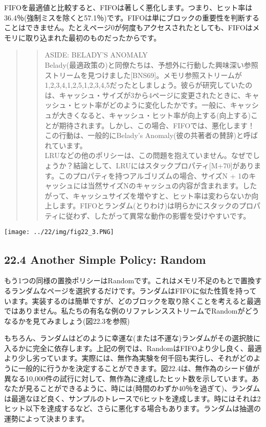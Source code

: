 FIFOを最適値と比較すると、FIFOは著しく悪化します。つまり、ヒット率は36.4％(強制ミスを除くと57.1％)です。FIFOは単にブロックの重要性を判断することはできません。たとえページ0が何度もアクセスされたとしても、FIFOはメモリに取り込まれた最初のものだったからです。

\begin{quote}
\begin{quote}
ASIDE: BELADY'S ANOMALY\\
Belady(最適政策の)と同僚たちは、予想外に行動した興味深い参照ストリームを見つけました{[}BNS69{]}。メモリ参照ストリームが1,2,3,4,1,2,5,1,2,3,4,5だったとしましょう。彼らが研究していたのは、キャッシュ・サイズが3から4ページに変更されたときに、キャッシュ・ヒット率がどのように変化したかです。一般に、キャッシュが大きくなると、キャッシュ・ヒット率が向上する(向上する)ことが期待されます。しかし、この場合、FIFOでは、悪化します！この行動は、一般的にBelady's
Anomaly(彼の共著者の賛辞)と呼ばれています。\\
LRUなどの他のポリシーは、この問題を抱えていません。なぜでしょうか？結論として、LRUにはスタックプロパティ{[}M+70{]}があります。このプロパティを持つアルゴリズムの場合、サイズN
+
1のキャッシュには当然サイズNのキャッシュの内容が含まれます。したがって、キャッシュサイズを増やすと、ヒット率は変わらないか向上します。FIFOとランダム(とりわけ)は明らかにスタックのプロパティに従わず、したがって異常な動作の影響を受けやすいです。
\end{quote}
\end{quote}

\texttt{[image: ../22/img/fig22\_3.PNG]}

\hypertarget{another-simple-policy-random}{%
\subsection*{22.4 Another Simple Policy:
Random}\label{another-simple-policy-random}}

もう1つの同様の置換ポリシーはRandomです。これはメモリ不足のもとで置換するランダムなページを選択するだけです。ランダムはFIFOに似た性質を持っています。実装するのは簡単ですが、どのブロックを取り除くことを考えると最適ではありません。私たちの有名な例のリファレンスストリームでRandomがどうなるかを見てみましょう(図22.3を参照)

もちろん、ランダムはどのように幸運な(または不運な)ランダムがその選択肢に入るかに完全に依存します。上記の例では、RandomはFIFOより少し良く、最適より少し劣っています。実際には、無作為実験を何千回も実行し、それがどのように一般的に行うかを決定することができます。図22.4は、無作為のシード値が異なる10,000件の試行に対して、無作為に達成したヒット数を示しています。あなたが見ることができるように、時には(時間のわずか40％を過ぎて)、ランダムは最適なほど良く、サンプルのトレースで6ヒットを達成します。時にはそれは2ヒット以下を達成するなど、さらに悪化する場合もあります。ランダムは抽選の運勢によって決まります。

